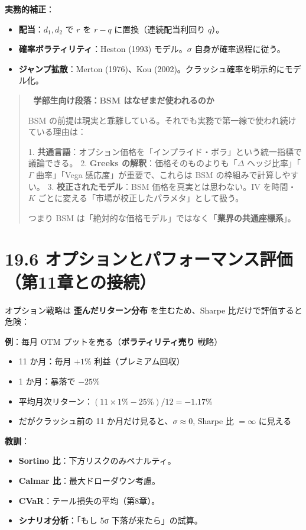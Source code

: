 \documentclass[11pt,a4paper]{report}
\begin{document}
\textbf{実務的補正}：
\begin{itemize}
\item \textbf{配当}：$d_1, d_2$ で $r$ を $r - q$ に置換（連続配当利回り $q$）。
\item \textbf{確率ボラティリティ}：Heston (1993) モデル。$\sigma$ 自身が確率過程に従う。
\item \textbf{ジャンプ拡散}：Merton (1976)、Kou (2002)。クラッシュ確率を明示的にモデル化。
\end{itemize}

\begin{quote}
📐 \textbf{学部生向け段落：BSM はなぜまだ使われるのか}

BSM の前提は現実と乖離している。それでも実務で第一線で使われ続けている理由は：

1. \textbf{共通言語}：オプション価格を「インプライド・ボラ」という統一指標で議論できる。
2. \textbf{Greeks の解釈}：価格そのものよりも「$\Delta$ ヘッジ比率」「$\Gamma$ 曲率」「Vega 感応度」が重要で、これらは BSM の枠組みで計算しやすい。
3. \textbf{校正されたモデル}：BSM 価格を真実とは思わない。IV を時間・$K$ ごとに変える「市場が校正したパラメタ」として扱う。

つまり BSM は「絶対的な価格モデル」ではなく「\textbf{業界の共通座標系}」。
\end{quote}

\section{19.6 オプションとパフォーマンス評価（第11章との接続）}

オプション戦略は \textbf{歪んだリターン分布} を生むため、Sharpe 比だけで評価すると危険：

\textbf{例}：毎月 OTM プットを売る（\textbf{ボラティリティ売り} 戦略）
\begin{itemize}
\item 11 か月：毎月 $+1\%$ 利益（プレミアム回収）
\item 1 か月：暴落で $-25\%$
\item 平均月次リターン：$(11 \times 1\% - 25\%)/12 = -1.17\%$
\item だがクラッシュ前の 11 か月だけ見ると、$\sigma \approx 0$, Sharpe 比 $= \infty$ に見える
\end{itemize}

\textbf{教訓}：
\begin{itemize}
\item \textbf{Sortino 比}：下方リスクのみペナルティ。
\item \textbf{Calmar 比}：最大ドローダウン考慮。
\item \textbf{CVaR}：テール損失の平均（第8章）。
\item \textbf{シナリオ分析}：「もし 5σ 下落が来たら」の試算。
\end{itemize}
\end{document}
